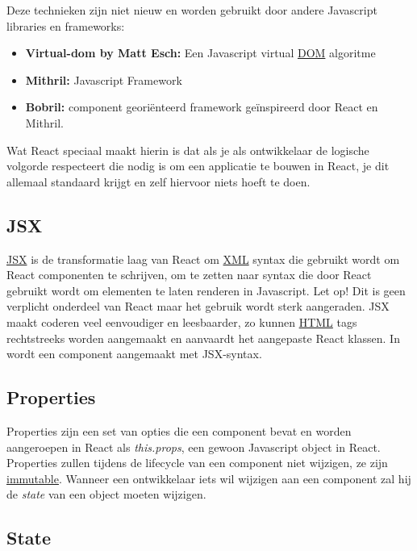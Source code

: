 		Deze technieken zijn niet nieuw en worden gebruikt door andere Javascript libraries en frameworks:
		
		\begin{itemize}
			\item \textbf{Virtual-dom by Matt Esch:} Een Javascript virtual \hyperref[dom]{DOM} algoritme
			\item \textbf{Mithril:} Javascript Framework
			\item \textbf{Bobril:} component georiënteerd framework geïnspireerd door React en Mithril.
		\end{itemize}
		
		Wat React speciaal maakt hierin is dat als je als ontwikkelaar de logische volgorde respecteert die nodig is om een applicatie te bouwen in React, je dit allemaal standaard krijgt en zelf hiervoor niets hoeft te doen.
	
	\subsection{JSX}
		
		\hyperref[jsx]{JSX} is de transformatie laag van React om \hyperref[xml]{XML} syntax die gebruikt wordt om React componenten te schrijven, om te zetten naar syntax die door React gebruikt wordt om elementen te laten renderen in Javascript. Let op! Dit is geen verplicht onderdeel van React maar het gebruik wordt sterk aangeraden. JSX maakt coderen veel eenvoudiger en leesbaarder, zo kunnen \hyperref[html]{HTML} tags rechtstreeks worden aangemaakt en aanvaardt het aangepaste React klassen. In  wordt een component aangemaakt met JSX-syntax.
		
	
	\subsection{Properties}
		
		Properties zijn een set van opties die een component bevat en worden aangeroepen in React als \emph{this.props}, een gewoon Javascript object in React. Properties zullen tijdens de lifecycle van een component niet wijzigen, ze zijn \hyperref[immutable]{immutable}. Wanneer een ontwikkelaar iets wil wijzigen aan een component zal hij de \emph{state} van een object moeten wijzigen.
	
	\subsection{State}
		
